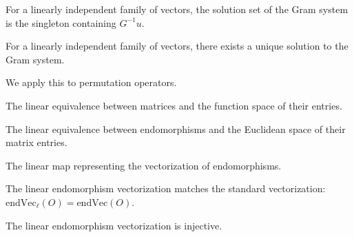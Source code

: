 \begin{theorem}\label{thm:gram_solutionSet_eq_singleton}
  \leanok
  For a linearly independent family of vectors, the solution set of the Gram system is the singleton containing $G^{-1} u$.
\end{theorem}

\begin{theorem}\label{thm:gram_system_unique}
  \leanok
  For a linearly independent family of vectors, there exists a unique solution to the Gram system.
\end{theorem}

We apply this to permutation operators.

\begin{definition}\label{def:matrixEntriesEquiv}
  \leanok
  The linear equivalence between matrices and the function space of their entries.
\end{definition}

\begin{definition}\label{def:endVecEquiv}
  \leanok
  The linear equivalence between endomorphisms and the Euclidean space of their matrix entries.
\end{definition}

\begin{definition}\label{def:endVecₗ}
  \leanok
  The linear map representing the vectorization of endomorphisms.
\end{definition}

\begin{theorem}\label{thm:endVecₗ_apply}
  \leanok
  The linear endomorphism vectorization matches the standard vectorization: $\text{endVec}_\ell(O) = \text{endVec}(O)$.
\end{theorem}

\begin{theorem}\label{thm:endVecₗ_injective}
  \leanok
  The linear endomorphism vectorization is injective.
\end{theorem}

